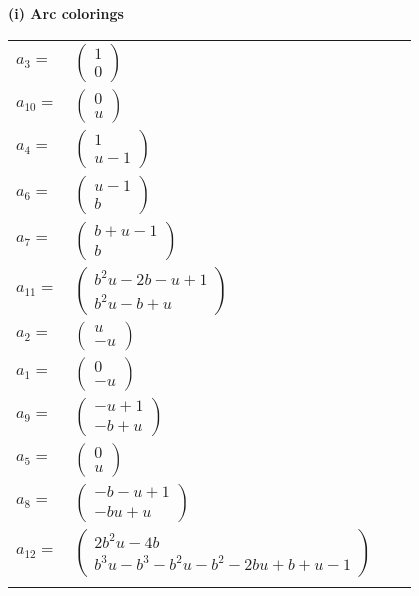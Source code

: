 \documentclass[1p]{elsarticle_modified}
\theoremstyle{definition}
\begin{document}
\flushleft \textbf{(i) Arc colorings}\\
\begin{tabular}{m{7pt} m{180pt} m{7pt} m{180pt} }
\flushright $a_{3}=$&$\begin{pmatrix}1\\0\end{pmatrix}$ \\
\flushright $a_{10}=$&$\begin{pmatrix}0\\u\end{pmatrix}$ \\
\flushright $a_{4}=$&$\begin{pmatrix}1\\u-1\end{pmatrix}$ \\
\flushright $a_{6}=$&$\begin{pmatrix}u-1\\b\end{pmatrix}$ \\
\flushright $a_{7}=$&$\begin{pmatrix}b+u-1\\b\end{pmatrix}$ \\
\flushright $a_{11}=$&$\begin{pmatrix}b^2 u-2 b- u+1\\b^2 u- b+u\end{pmatrix}$ \\
\flushright $a_{2}=$&$\begin{pmatrix}u\\- u\end{pmatrix}$ \\
\flushright $a_{1}=$&$\begin{pmatrix}0\\- u\end{pmatrix}$ \\
\flushright $a_{9}=$&$\begin{pmatrix}- u+1\\- b+u\end{pmatrix}$ \\
\flushright $a_{5}=$&$\begin{pmatrix}0\\u\end{pmatrix}$ \\
\flushright $a_{8}=$&$\begin{pmatrix}- b- u+1\\- b u+u\end{pmatrix}$ \\
\flushright $a_{12}=$&$\begin{pmatrix}2 b^2 u-4 b\\b^3 u- b^3- b^2 u- b^2-2 b u+b+u-1\end{pmatrix}$\\&\end{tabular}
\end{document}
